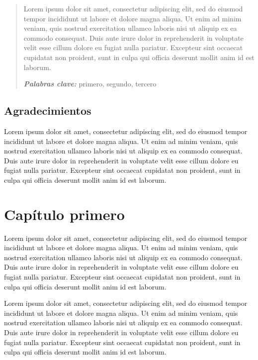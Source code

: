 \documentclass[12pt,a4paper]{report}
\providecommand{\keywords}[1]
{
  \small	
  \textbf{\textit{Palabras clave:\hspace{0.3cm}}} #1
}
\begin{document}
\tableofcontents	
{}
\listoffigures
\listoftables

\begin{abstract}
Lorem ipsum dolor sit amet, consectetur adipiscing elit, sed do eiusmod tempor incididunt ut labore et dolore magna aliqua. Ut enim ad minim veniam, quis nostrud exercitation ullamco laboris nisi ut aliquip ex ea commodo consequat. Duis aute irure dolor in reprehenderit in voluptate velit esse cillum dolore eu fugiat nulla pariatur. Excepteur sint occaecat cupidatat non proident, sunt in culpa qui officia deserunt mollit anim id est laborum.
\vspace{0.5cm}

\keywords{primero, segundo, tercero}
\end{abstract}
\newpage
\section*{Agradecimientos}\label{sec:agradecimientos}
Lorem ipsum dolor sit amet, consectetur adipiscing elit, sed do eiusmod tempor incididunt ut labore et dolore magna aliqua. Ut enim ad minim veniam, quis nostrud exercitation ullamco laboris nisi ut aliquip ex ea commodo consequat. Duis aute irure dolor in reprehenderit in voluptate velit esse cillum dolore eu fugiat nulla pariatur. Excepteur sint occaecat cupidatat non proident, sunt in culpa qui officia deserunt mollit anim id est laborum.

	

\chapter{Capítulo primero}\label{cap:cap1}

Lorem ipsum dolor sit amet, consectetur adipiscing elit, sed do eiusmod tempor incididunt ut labore et dolore magna aliqua. Ut enim ad minim veniam, quis nostrud exercitation ullamco laboris nisi ut aliquip ex ea commodo consequat. Duis aute irure dolor in reprehenderit in voluptate velit esse cillum dolore eu fugiat nulla pariatur. Excepteur sint occaecat cupidatat non proident, sunt in culpa qui officia deserunt mollit anim id est laborum.

Lorem ipsum dolor sit amet, consectetur adipiscing elit, sed do eiusmod tempor incididunt ut labore et dolore magna aliqua. Ut enim ad minim veniam, quis nostrud exercitation ullamco laboris nisi ut aliquip ex ea commodo consequat. Duis aute irure dolor in reprehenderit in voluptate velit esse cillum dolore eu fugiat nulla pariatur. Excepteur sint occaecat cupidatat non proident, sunt in culpa qui officia deserunt mollit anim id est laborum.
\end{document}
